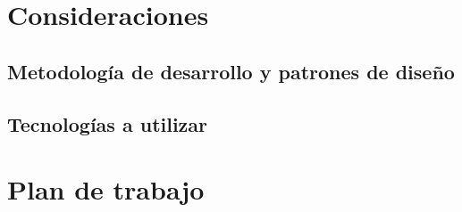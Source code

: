 
\section{Consideraciones}


\subsection{Metodología de desarrollo y patrones de diseño}

\subsection{Tecnologías a utilizar}

\section{Plan de trabajo}
